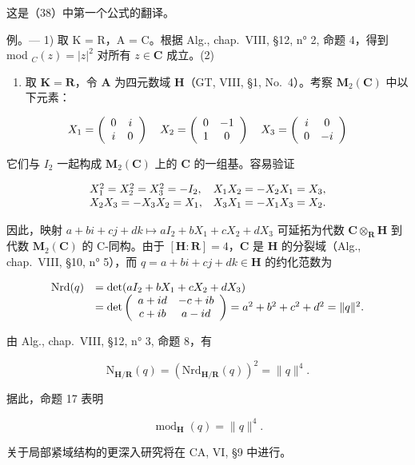 这是（38）中第一个公式的翻译。

例。--- 1) 取 K = R，A = C。根据 Alg., chap.~VIII, §12, n° 2, 命题 4，得到 mod \(_{C}(z) = |z|^{2}\) 对所有 \(z \in \mathbf{C}\) 成立。(2)

\begin{enumerate}
\def\labelenumi{\arabic{enumi})}
\setcounter{enumi}{1}
\tightlist
\item
  取 \(\mathbf{K} = \mathbf{R}\)，令 \(\mathbf{A}\) 为四元数域 \(\mathbf{H}\)（GT, VIII, §1, No.~4）。考察 \(\mathbf{M}_2(\mathbf{C})\) 中以下元素：
\end{enumerate}

\[
X _ {1} = \left( \begin{array}{c c} 0 & i \\ i & 0 \end{array} \right) \quad X _ {2} = \left( \begin{array}{c c} 0 & - 1 \\ 1 & 0 \end{array} \right) \quad X _ {3} = \left( \begin{array}{c c} i & 0 \\ 0 & - i \end{array} \right)
\]

它们与 \(I_2\) 一起构成 \(\mathbf{M}_2(\mathbf{C})\) 上的 \(\mathbf{C}\) 的一组基。容易验证

\[
\begin{array}{l l} {X _ {1} ^ {2} = X _ {2} ^ {2} = X _ {3} ^ {2} = - I _ {2},} & {X _ {1} X _ {2} = - X _ {2} X _ {1} = X _ {3},} \\ {X _ {2} X _ {3} = - X _ {3} X _ {2} = X _ {1},} & {X _ {3} X _ {1} = - X _ {1} X _ {3} = X _ {2}.} \end{array}
\]

因此，映射 \(a + bi + cj + dk \mapsto aI_2 + bX_1 + cX_2 + dX_3\) 可延拓为代数 \(\mathbf{C} \otimes_{\mathbf{R}} \mathbf{H}\) 到代数 \(\mathbf{M}_2(\mathbf{C})\) 的 C-同构。由于 \([\mathbf{H} : \mathbf{R}] = 4\)，\(\mathbf{C}\) 是 \(\mathbf{H}\) 的分裂域（Alg., chap.~VIII, §10, n° 5），而 \(q = a + bi + cj + dk \in \mathbf{H}\) 的约化范数为

\[
\begin{array}{r l} \mathrm{Nrd} (q) & = \det (a I _ {2} + b X _ {1} + c X _ {2} + d X _ {3}) \\ & = \det \left( \begin{array}{c c} a + i d & - c + i b \\ c + i b & a - i d \end{array} \right) = a ^ {2} + b ^ {2} + c ^ {2} + d ^ {2} = \| q \| ^ {2}. \end{array}
\]

由 Alg., chap.~VIII, §12, n° 3, 命题 8，有

\[
\mathrm{N} _ {\mathbf {H} / \mathbf {R}} (q) = \left(\mathrm{Nrd} _ {\mathbf {H} / \mathbf {R}} (q)\right) ^ {2} = \| q \| ^ {4}.
\]

据此，命题 17 表明

\[
\operatorname{mod} _ {\mathbf {H}} (q) = \| q \| ^ {4}.
\]

关于局部紧域结构的更深入研究将在 CA, VI, §9 中进行。


